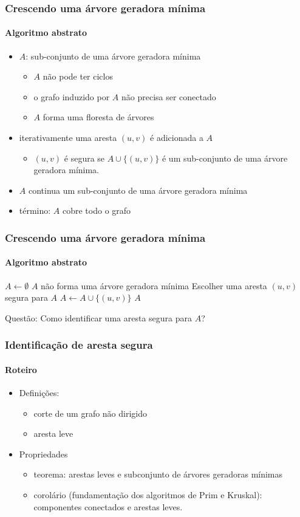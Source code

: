 \documentclass{beamer}
\begin{document}
\begin{frame}
\frametitle{Crescendo uma árvore geradora mínima}
\framesubtitle{Algoritmo abstrato}

\begin{itemize}
\item $A$: sub-conjunto de uma árvore geradora mínima
\begin{itemize}
\item $A$ não pode ter ciclos
\item o grafo induzido por $A$ não precisa ser conectado
\item $A$ forma uma floresta de árvores
\end{itemize}
\item iterativamente uma aresta $(u, v)$ é adicionada a $A$
\begin{itemize}
\item $(u, v)$ é \alert{segura} se $A \cup \{(u, v)\}$ é um sub-conjunto de uma árvore geradora mínima.
\end{itemize}
\item $A$ continua um sub-conjunto de uma árvore geradora mínima
\item término: $A$ cobre todo o grafo
\end{itemize}
\end{frame}

\begin{frame}
\frametitle{Crescendo uma árvore geradora mínima}
\framesubtitle{Algoritmo abstrato}

\begin{codebox}
\zi $A \gets \emptyset$
\zi {}
\zi \While $A$ não forma uma árvore geradora mínima
\zi \Do Escolher uma aresta $(u, v)$ segura para $A$
\zi   $A \gets A \cup \{ (u, v) \}$
    \End
\zi \Return $A$
\end{codebox}
\pause
\alert{Questão:} Como identificar uma aresta segura para $A$?
\end{frame}

\begin{frame}
\frametitle{Identificação de aresta segura}
\framesubtitle{Roteiro}

\begin{itemize}
\item Definições:
\begin{itemize}
\item corte de um grafo não dirigido
\item aresta leve
\end{itemize}
\item Propriedades
\begin{itemize}
\item teorema: arestas leves e subconjunto de árvores geradoras mínimas
\item corolário (fundamentação dos algoritmos de Prim e Kruskal):
  componentes conectados e arestas leves.
\end{itemize}
\end{itemize}
\end{frame}
\end{document}
